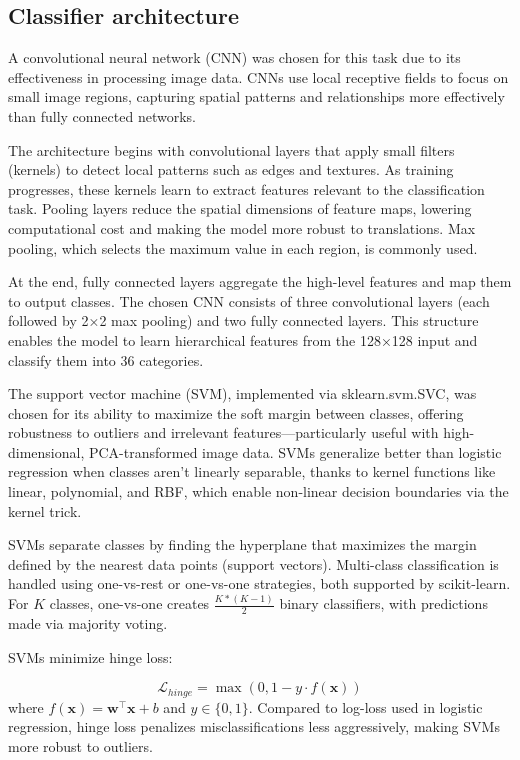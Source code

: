 \documentclass[a4, 10 pt, conference]{ieeeconf}  %
\begin{document}
\subsection{Classifier architecture}
\label{subsec:architecture}

A convolutional neural network (CNN) was chosen for this task due to its effectiveness in processing image data. CNNs use local receptive fields to focus on small image regions, capturing spatial patterns and relationships more effectively than fully connected networks.

The architecture begins with convolutional layers that apply small filters (kernels) to detect local patterns such as edges and textures. As training progresses, these kernels learn to extract features relevant to the classification task. Pooling layers reduce the spatial dimensions of feature maps, lowering computational cost and making the model more robust to translations. Max pooling, which selects the maximum value in each region, is commonly used.

At the end, fully connected layers aggregate the high-level features and map them to output classes. The chosen CNN consists of three convolutional layers (each followed by 2×2 max pooling) and two fully connected layers. This structure enables the model to learn hierarchical features from the 128×128 input and classify them into 36 categories.

The support vector machine (SVM), implemented via sklearn.svm.SVC, was chosen for its ability to maximize the soft margin between classes, offering robustness to outliers and irrelevant features—particularly useful with high-dimensional, PCA-transformed image data. SVMs generalize better than logistic regression when classes aren't linearly separable, thanks to kernel functions like linear, polynomial, and RBF, which enable non-linear decision boundaries via the kernel trick.

SVMs separate classes by finding the hyperplane that maximizes the margin defined by the nearest data points (support vectors). Multi-class classification is handled using one-vs-rest or one-vs-one strategies, both supported by scikit-learn. For $K$ classes, one-vs-one creates $\frac{K*(K-1)}{2}$ binary classifiers, with predictions made via majority voting.

SVMs minimize hinge loss:

\[
  \mathcal{L}_{hinge} = \max(0, 1 - y \cdot f(\mathbf{x}))
\]
where $f(\mathbf{x}) = \mathbf{w}^\top \mathbf{x} + b$ and $y \in \{0, 1\}$. Compared to log-loss used in logistic regression, hinge loss penalizes misclassifications less aggressively, making SVMs more robust to outliers.
\end{document}
